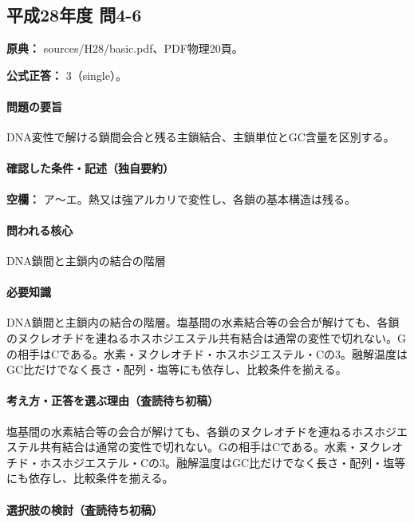\subsection{平成28年度 問4-6}
\label{q:h28-reg-basic-4-6}

\noindent\textbf{原典：} sources/H28/basic.pdf、PDF物理20頁。

\textbf{公式正答：} 3（single）。

\paragraph{問題の要旨} DNA変性で解ける鎖間会合と残る主鎖結合、主鎖単位とGC含量を区別する。

\paragraph{確認した条件・記述（独自要約）}\mbox{}\par

\noindent\textbf{空欄：} ア〜エ。熱又は強アルカリで変性し、各鎖の基本構造は残る。\par

\paragraph{問われる核心} DNA鎖間と主鎖内の結合の階層

\paragraph{必要知識} DNA鎖間と主鎖内の結合の階層。塩基間の水素結合等の会合が解けても、各鎖のヌクレオチドを連ねるホスホジエステル共有結合は通常の変性で切れない。Gの相手はCである。水素・ヌクレオチド・ホスホジエステル・Cの3。融解温度はGC比だけでなく長さ・配列・塩等にも依存し、比較条件を揃える。

\paragraph{考え方・正答を選ぶ理由（査読待ち初稿）} 塩基間の水素結合等の会合が解けても、各鎖のヌクレオチドを連ねるホスホジエステル共有結合は通常の変性で切れない。Gの相手はCである。水素・ヌクレオチド・ホスホジエステル・Cの3。融解温度はGC比だけでなく長さ・配列・塩等にも依存し、比較条件を揃える。

\paragraph{選択肢の検討（査読待ち初稿）}\mbox{}\par

